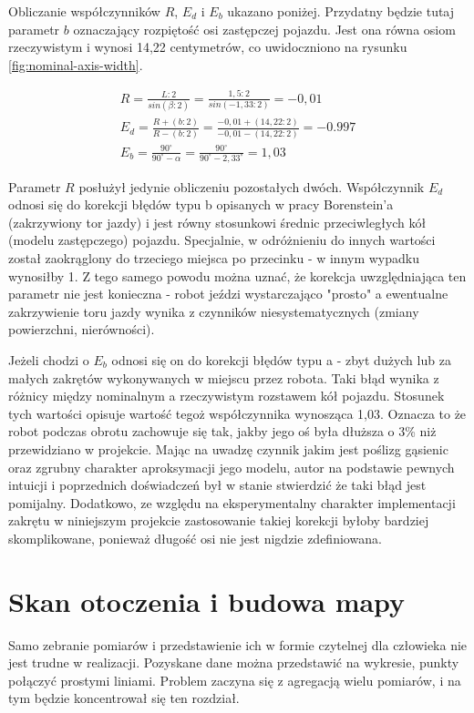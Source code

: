 Obliczanie współczynników $R$, $E_{d}$ i $E_{b}$ ukazano poniżej. Przydatny będzie tutaj parametr $b$ oznaczający rozpiętość osi zastępczej pojazdu. Jest ona równa osiom rzeczywistym i wynosi 14,22 centymetrów, co uwidoczniono na rysunku \ref{fig:nominal-axis-width}.

\begin{equation}
\begin{aligned}
    R = \frac{L : 2}{sin(\beta : 2)} = \frac{1,5 : 2}{sin(-1,33 : 2)} = -0,01 \\[5pt]
    E_{d} = \frac{R + (b : 2)}{R - (b : 2)} = \frac{-0,01 + (14,22 : 2)}{-0,01 - (14,22 : 2)} = -0.997 \\[5pt]
    E_{b} = \frac{90^{\circ}}{90^{\circ} - \alpha} = \frac{90^{\circ}}{90^{\circ} - 2,33^{\circ}} = 1,03
\end{aligned}
\end{equation}


Parametr $R$ posłużył jedynie obliczeniu pozostałych dwóch. Współczynnik $E_{d}$ odnosi się do korekcji błędów typu b opisanych w pracy Borenstein'a (zakrzywiony tor jazdy) i jest równy stosunkowi średnic przeciwległych kół (modelu zastępczego) pojazdu. Specjalnie, w odróżnieniu do innych wartości został zaokrąglony do trzeciego miejsca po przecinku - w innym wypadku wynosiłby 1. Z tego samego powodu można uznać, że korekcja uwzględniająca ten parametr nie jest konieczna - robot jeździ wystarczająco "prosto" a ewentualne zakrzywienie toru jazdy wynika z czynników niesystematycznych (zmiany powierzchni, nierówności).

Jeżeli chodzi o $E_{b}$ odnosi się on do korekcji błędów typu a - zbyt dużych lub za małych zakrętów wykonywanych w miejscu przez robota. Taki błąd wynika z różnicy między nominalnym a rzeczywistym rozstawem kół pojazdu. Stosunek tych wartości opisuje wartość tegoż współczynnika wynosząca 1,03. Oznacza to że robot podczas obrotu zachowuje się tak, jakby jego oś była dłuższa o 3\% niż przewidziano w projekcie. Mając na uwadzę czynnik jakim jest poślizg gąsienic oraz zgrubny charakter aproksymacji jego modelu, autor na podstawie pewnych intuicji i poprzednich doświadczeń był w stanie stwierdzić że taki błąd jest pomijalny. Dodatkowo, ze względu na eksperymentalny charakter implementacji zakrętu w niniejszym projekcie zastosowanie takiej korekcji byłoby bardziej skomplikowane, ponieważ długość osi nie jest nigdzie zdefiniowana.

\section{Skan otoczenia i budowa mapy}
\label{sec:scan}
Samo zebranie pomiarów i przedstawienie ich w formie czytelnej dla człowieka nie jest trudne w realizacji. Pozyskane dane można przedstawić na wykresie, punkty połączyć prostymi liniami. Problem zaczyna się z agregacją wielu pomiarów, i na tym będzie koncentrował się ten rozdział.

